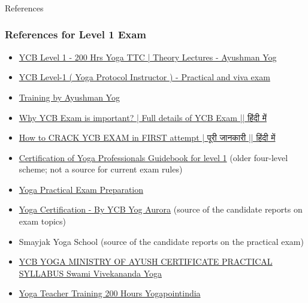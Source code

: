 \begin{frame}[fragile]\frametitle{}
\begin{center}
{\Large References}
\end{center}
\end{frame}

\begin{frame}[fragile]\frametitle{References for Level 1 Exam}

    \begin{itemize}
        \item \href{https://www.youtube.com/playlist?list=PL3EqlKH94cs4R6dM7IObWxxVERMVq6ujb}{YCB Level 1 - 200 Hrs Yoga TTC | Theory Lectures - Ayushman Yog}
        \item \href{https://www.youtube.com/watch?v=hIn-4tIbqzY}{YCB Level-1 ( Yoga Protocol Instructor ) - Practical and viva exam}
        \item \href{https://www.ayushmanyog.com/}{Training by Ayushman Yog}
        \item \href{https://www.youtube.com/watch?v=dcgclaWQlBE}{Why YCB Exam is important? | Full details of YCB Exam || हिंदी में}
        \item \href{https://www.youtube.com/watch?v=uJmlKFNzqTw}{How to CRACK YCB EXAM in FIRST attempt | पूरी जानकारी || हिंदी में}
        \item \href{https://www.amazon.in/Certification-Yoga-Professionals-Guidebook-level/dp/8183231837}{Certification of Yoga Professionals Guidebook for level 1} (older four-level scheme; not a source for current exam rules)
        \item \href{https://www.youtube.com/watch?v=pEnj0LDEQ-o}{Yoga Practical Exam Preparation}
        \item \href{https://www.youtube.com/playlist?list=PLCCm_6ZMItDNbits0GVY2sTDmPZ8lzlt0}{Yoga Certification - By YCB Yog Aurora} (source of the candidate reports on exam topics)
        \item Smayjak Yoga School (source of the candidate reports on the practical exam)
        \item \href{https://www.youtube.com/playlist?list=PLwTNiWTjM67Pvxx8and-2rbosuXmmI1MK}{YCB YOGA MINISTRY OF AYUSH CERTIFICATE PRACTICAL SYLLABUS Swami Vivekananda Yoga}
        \item \href{https://www.youtube.com/playlist?list=PLHDygCsgSb2sIXFisA-jVjPyBfn_V22k9}{Yoga Teacher Training 200 Hours Yogapointindia}
    \end{itemize}

\end{frame}